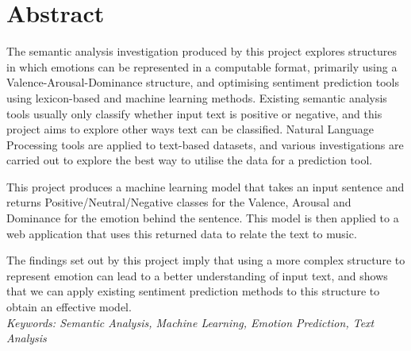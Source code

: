 \section{Abstract}

The semantic analysis investigation produced by this project explores structures in which emotions can be represented in a computable format, primarily using a Valence-Arousal-Dominance structure, and optimising sentiment prediction tools using lexicon-based and machine learning methods. Existing semantic analysis tools usually only classify whether input text is positive or negative, and this project aims to explore other ways text can be classified.
Natural Language Processing tools are applied to text-based datasets, and various investigations are carried out to explore the best way to utilise the data for a prediction tool.

This project produces a machine learning model that takes an input sentence and returns Positive/Neutral/Negative classes for the Valence, Arousal and Dominance for the emotion behind the sentence. This model is then applied to a web application that uses this returned data to relate the text to music. 

The findings set out by this project imply that using a more complex structure to represent emotion can lead to a better understanding of input text, and shows that we can apply existing sentiment prediction methods to this structure to obtain an effective model.
\\
\textit{Keywords: Semantic Analysis, Machine Learning, Emotion Prediction, Text Analysis}